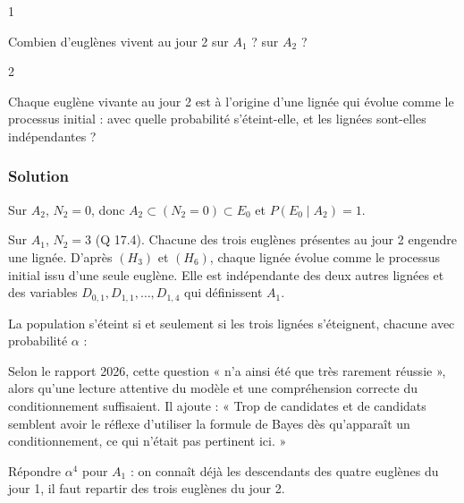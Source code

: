 \documentclass[11pt,a4paper]{article}
\newcommand{\equationajustee}[1]{%
  \sbox{\boiteequation}{$\displaystyle #1$}%
  \ifdim\wd\boiteequation>\linewidth
    \[\resizebox{\linewidth}{!}{\usebox{\boiteequation}}\]%
  \else
    \[#1\]%
  \fi}
\begin{document}
\begin{indication}{1}

Combien d'euglènes vivent au jour 2 sur \(A_1\) ? sur \(A_2\) ?

\end{indication}

\begin{indication}{2}

Chaque euglène vivante au jour 2 est à l'origine d'une lignée qui évolue comme le processus initial : avec quelle probabilité s'éteint-elle, et les lignées sont-elles indépendantes ?

\end{indication}

\hypertarget{solution-40}{%
\subsubsection{Solution}\label{solution-40}}

Sur \(A_2\), \(N_2=0\), donc \(A_2\subset(N_2=0)\subset E_0\) et \(P(E_0\mid A_2)=1\).

Sur \(A_1\), \(N_2=3\) (Q 17.4). Chacune des trois euglènes présentes au jour 2 engendre une lignée. D'après \((H_3)\) et \((H_6)\), chaque lignée évolue comme le processus initial issu d'une seule euglène. Elle est indépendante des deux autres lignées et des variables \(D_{0,1},D_{1,1},\dots,D_{1,4}\) qui définissent \(A_1\).

La population s'éteint si et seulement si les trois lignées s'éteignent, chacune avec probabilité \(\alpha\) :

\equationajustee{\boxed{P(E_0\mid A_1)=\alpha^3}}

\equationajustee{\boxed{P(E_0\mid A_2)=1}}

\begin{jury}

Selon le rapport 2026, cette question « n'a ainsi été que très rarement réussie », alors qu'une lecture attentive du modèle et une compréhension correcte du conditionnement suffisaient. Il ajoute : « Trop de candidates et de candidats semblent avoir le réflexe d'utiliser la formule de Bayes dès qu'apparaît un conditionnement, ce qui n'était pas pertinent ici. »

\end{jury}

\begin{piege}

Répondre \(\alpha^4\) pour \(A_1\) : on connaît déjà les descendants des quatre euglènes du jour 1, il faut repartir des trois euglènes du jour 2.

\end{piege}
\end{document}
